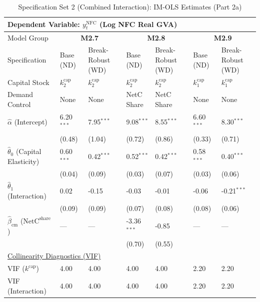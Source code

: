 \begin{table}[H]
\centering
\caption{Specification Set 2 (Combined Interaction): IM-OLS Estimates (Part 2a)}
\label{tab:spec_set_2_p2a}
\scriptsize
\begin{tabular}{p{3.8cm}p{2.1cm}p{2.1cm}p{2.1cm}p{2.1cm}p{2.1cm}p{2.1cm}}
\toprule
\multicolumn{7}{l}{\textbf{Dependent Variable: $y_t^{\text{NFC}}$ (Log NFC Real GVA)}} \\
\midrule
Model Group & \multicolumn{2}{c}{\textbf{M2.7}} & \multicolumn{2}{c}{\textbf{M2.8}} & \multicolumn{2}{c}{\textbf{M2.9}}  \\
Specification & Base (ND) & Break-Robust (WD) & Base (ND) & Break-Robust (WD) & Base (ND) & Break-Robust (WD)  \\
Capital Stock & $k^{\text{cap}}_2$ & $k^{\text{cap}}_2$ & $k^{\text{cap}}_2$ & $k^{\text{cap}}_2$ & $k^{\text{cap}}_1$ & $k^{\text{cap}}_1$  \\
Demand Control & None & None & NetC Share & NetC Share & None & None  \\
\midrule
$\hat{\alpha}$ (Intercept)  & 6.20$^{***}$ & 7.95$^{***}$ & 9.08$^{***}$ & 8.55$^{***}$ & 6.60$^{***}$ & 8.30$^{***}$  \\
 & {\scriptsize (0.48)} & {\scriptsize (1.04)} & {\scriptsize (0.72)} & {\scriptsize (0.86)} & {\scriptsize (0.33)} & {\scriptsize (0.71)}  \\
[1ex]
$\hat{\theta}_0$ (Capital Elasticity)  & 0.60$^{***}$ & 0.42$^{***}$ & 0.52$^{***}$ & 0.42$^{***}$ & 0.58$^{***}$ & 0.40$^{***}$  \\
 & {\scriptsize (0.04)} & {\scriptsize (0.09)} & {\scriptsize (0.03)} & {\scriptsize (0.07)} & {\scriptsize (0.03)} & {\scriptsize (0.06)}  \\
$\hat{\theta}_1$ (Interaction)  & 0.02 & -0.15 & -0.03 & -0.01 & -0.06 & -0.21$^{***}$  \\
 & {\scriptsize (0.09)} & {\scriptsize (0.09)} & {\scriptsize (0.07)} & {\scriptsize (0.08)} & {\scriptsize (0.08)} & {\scriptsize (0.06)}  \\
$\hat{\beta}_{\text{cm}}$ ($\text{NetC}^{\text{share}}$)  & --- & --- & -3.36$^{***}$ & -0.85 & --- & ---  \\
 &  &  & {\scriptsize (0.70)} & {\scriptsize (0.55)} &  &   \\
\midrule
\multicolumn{7}{l}{\underline{Collinearity Diagnostics (VIF)}} \\
VIF ($k^{\text{cap}}$) & 4.00 & 4.00 & 4.00 & 4.00 & 2.20 & 2.20  \\
VIF (Interaction) & 4.00 & 4.00 & 4.00 & 4.00 & 2.20 & 2.20  \\

\end{tabular}
\end{table}
